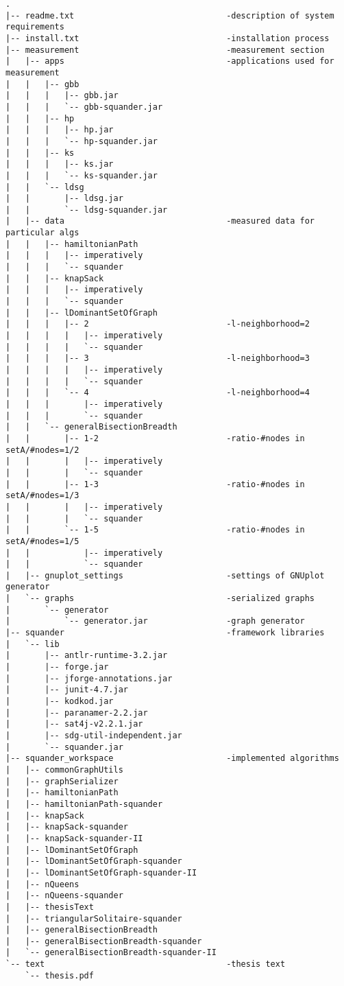 \tiny
\begin{verbatim}
.
|-- readme.txt                               -description of system requirements
|-- install.txt                              -installation process
|-- measurement                              -measurement section
|   |-- apps                                 -applications used for measurement
|   |   |-- gbb
|   |   |   |-- gbb.jar
|   |   |   `-- gbb-squander.jar
|   |   |-- hp
|   |   |   |-- hp.jar
|   |   |   `-- hp-squander.jar
|   |   |-- ks
|   |   |   |-- ks.jar
|   |   |   `-- ks-squander.jar
|   |   `-- ldsg
|   |       |-- ldsg.jar
|   |       `-- ldsg-squander.jar
|   |-- data                                 -measured data for particular algs
|   |   |-- hamiltonianPath
|   |   |   |-- imperatively
|   |   |   `-- squander
|   |   |-- knapSack
|   |   |   |-- imperatively
|   |   |   `-- squander
|   |   |-- lDominantSetOfGraph
|   |   |   |-- 2                            -l-neighborhood=2
|   |   |   |   |-- imperatively
|   |   |   |   `-- squander
|   |   |   |-- 3                            -l-neighborhood=3
|   |   |   |   |-- imperatively
|   |   |   |   `-- squander
|   |   |   `-- 4                            -l-neighborhood=4
|   |   |       |-- imperatively
|   |   |       `-- squander
|   |   `-- generalBisectionBreadth
|   |       |-- 1-2                          -ratio-#nodes in setA/#nodes=1/2
|   |       |   |-- imperatively
|   |       |   `-- squander
|   |       |-- 1-3                          -ratio-#nodes in setA/#nodes=1/3
|   |       |   |-- imperatively
|   |       |   `-- squander
|   |       `-- 1-5                          -ratio-#nodes in setA/#nodes=1/5
|   |           |-- imperatively
|   |           `-- squander
|   |-- gnuplot_settings                     -settings of GNUplot generator
|   `-- graphs                               -serialized graphs
|       `-- generator
|           `-- generator.jar                -graph generator
|-- squander                                 -framework libraries
|   `-- lib
|       |-- antlr-runtime-3.2.jar
|       |-- forge.jar
|       |-- jforge-annotations.jar
|       |-- junit-4.7.jar
|       |-- kodkod.jar
|       |-- paranamer-2.2.jar
|       |-- sat4j-v2.2.1.jar
|       |-- sdg-util-independent.jar
|       `-- squander.jar
|-- squander_workspace                       -implemented algorithms
|   |-- commonGraphUtils
|   |-- graphSerializer
|   |-- hamiltonianPath
|   |-- hamiltonianPath-squander
|   |-- knapSack
|   |-- knapSack-squander
|   |-- knapSack-squander-II
|   |-- lDominantSetOfGraph
|   |-- lDominantSetOfGraph-squander
|   |-- lDominantSetOfGraph-squander-II
|   |-- nQueens
|   |-- nQueens-squander
|   |-- thesisText
|   |-- triangularSolitaire-squander
|   |-- generalBisectionBreadth
|   |-- generalBisectionBreadth-squander
|   `-- generalBisectionBreadth-squander-II
`-- text                                     -thesis text
    `-- thesis.pdf
\end{verbatim}